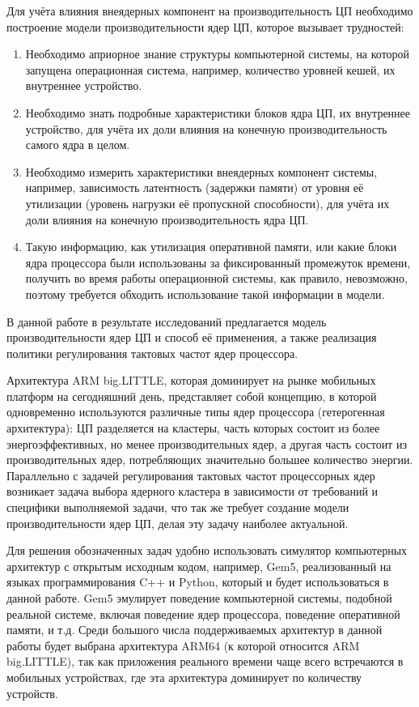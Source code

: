     Для учёта влияния внеядерных компонент на производительность ЦП необходимо построение
    модели производительности ядер ЦП, которое вызывает трудностей:
    \begin{enumerate}
        \item Необходимо априорное знание структуры компьютерной системы, на которой запущена
        операционная система, например, количество уровней кешей, их внутреннее устройство.
        \item Необходимо знать подробные характеристики блоков ядра ЦП, их внутреннее устройство, для
        учёта их доли влияния на конечную производительность самого ядра в целом.
        \item Необходимо измерить характеристики внеядерных компонент системы,
        например, зависимость латентность (задержки памяти) от уровня её утилизации (уровень
        нагрузки её пропускной способности), для учёта их доли влияния на конечную
        производительность ядра ЦП.
        \item Такую информацию, как утилизация оперативной памяти, или какие блоки ядра процессора
        были использованы за фиксированный промежуток времени, получить во время работы операционной
        системы, как правило, невозможно, поэтому требуется обходить использование такой информации
        в модели.
    \end{enumerate}

    В данной работе в результате исследований предлагается модель производительности ядер ЦП и
    способ её применения, а также реализация политики регулирования тактовых частот ядер процессора.

    Архитектура ARM big.LITTLE, которая доминирует на рынке
    мобильных платформ на сегодняшний день, представляет собой концепцию, в которой одновременно
    используются различные типы ядер процессора (гетерогенная архитектура): ЦП разделяется на
    кластеры, часть которых состоит из более энергоэффективных, но менее производительных ядер,
    а другая часть состоит из производительных ядер, потребляющих значительно большее
    количество энергии. Параллельно с задачей регулирования тактовых частот
    процессорных ядер возникает задача выбора ядерного кластера в зависимости от требований и
    специфики выполняемой задачи, что так же требует создание модели производительности ядер ЦП,
    делая эту задачу наиболее актуальной.

    Для решения обозначенных задач удобно использовать симулятор компьютерных
    архитектур с открытым исходным кодом, например, Gem5, реализованный на языках программирования
    C++ и Python, который и будет использоваться в
    данной работе. Gem5 эмулирует поведение компьютерной системы, подобной реальной системе,
    включая поведение ядер процессора, поведение оперативной памяти, и т.д. Среди большого числа
    поддерживаемых архитектур в данной работы будет выбрана архитектура ARM64 (к которой относится
    ARM big.LITTLE), так как приложения реального времени чаще всего встречаются в мобильных устройствах,
    где эта архитектура доминирует по количеству устройств.

